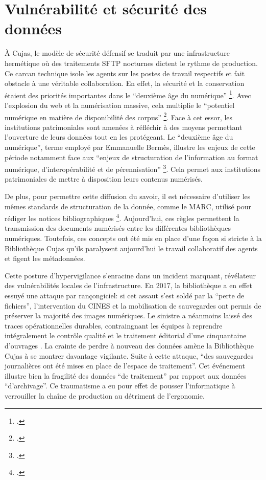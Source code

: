 \section{Vulnérabilité et sécurité des données}
À Cujas, le modèle de sécurité défensif se traduit par une infrastructure hermétique où des traitements \ac{SFTP} nocturnes dictent le rythme de production. Ce carcan technique isole les agents sur les postes de travail respectifs et fait obstacle à une véritable collaboration. En effet, la sécurité et la conservation étaient des priorités importantes dans le \enquote{deuxième âge du numérique} \footcite{bermesTroisAgesNumerique}. Avec l'explosion du web et la numérisation massive, cela multiplie le \enquote{potentiel numérique en matière de disponibilité des corpus} \footcite{bermesTroisAgesNumerique}. Face à cet essor, les institutions patrimoniales sont amenées à réfléchir à des moyens permettant l'ouverture de leurs données tout en les protégeant. Le \enquote{deuxième âge du numérique}, terme employé par Emmanuelle Bermès, illustre les enjeux de cette période notamment face aux \enquote{enjeux de structuration de l'information au format numérique, d'interopérabilité et de pérennisation} \footcite{bermesTroisAgesNumerique}. Cela permet aux institutions patrimoniales de mettre à disposition leurs contenus numérisés.

De plus, pour permettre cette diffusion du savoir, il est nécessaire d'utiliser les mêmes standards de structuration de la donnée, comme le MARC, utilisé pour rédiger les notices bibliographiques \footcite{westeelIndexerStructurerEchanger2010}. Aujourd'hui, ces règles permettent la transmission des documents numérisés entre les différentes bibliothèques numériques. Toutefois, ces concepts ont été mis en place d'une façon si stricte à la Bibliothèque Cujas qu'ils paralysent aujourd'hui le travail collaboratif des agents et figent les métadonnées. 

Cette posture d'hypervigilance s'enracine dans un incident marquant, révélateur des vulnérabilités locales de l'infrastructure. En 2017, la bibliothèque a en effet essuyé une attaque par rançongiciel: si cet assaut s'est soldé par la \enquote{perte de fichiers}, l'intervention du \ac{CINES} et la mobilisation de sauvegardes ont permis de préserver la majorité des images numériques. Le sinistre a néanmoins laissé des traces opérationnelles durables, contraingnant les équipes à reprendre intégralement le contrôle qualité et le traitement éditorial d'une cinquantaine d'ouvrages . La crainte de perdre à nouveau des données amène la Bibliothèque Cujas à se montrer davantage vigilante. Suite à cette attaque, \enquote{des sauvegardes journalières ont été mises en place de l'espace de traitement}. Cet événement illustre bien la fragilité des données \enquote{de traitement} par rapport aux données \enquote{d'archivage}. Ce traumatisme a eu pour effet de pousser l'informatique à verrouiller la chaîne de production au détriment de l'ergonomie. 

